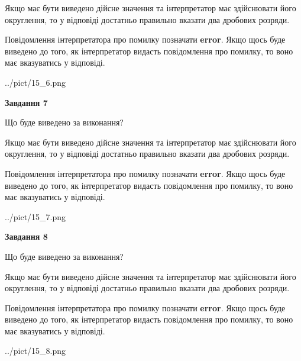 \documentclass[12pt, ukrainian]{article}
\begin{document}
{\begin {Large}
Якщо має бути виведено дійсне значення та інтерпретатор має здійснювати його округлення, 
то у відповіді достатньо правильно вказати два дробових розряди.

Повідомлення інтерпретатора про помилку позначати \textbf{error}.
Якщо щось буде виведено до того, як інтерпретатор видасть повідомлення про помилку, 
то воно має вказуватись у відповіді. \par

\begin{center}
	{../pict/15_6.png}
\end{center}
\newpage

{\begin {center}\textbf{Завдання 7}\end {center}}\par
Що буде виведено за виконання? \par

Якщо має бути виведено дійсне значення та інтерпретатор має здійснювати його округлення, 
то у відповіді достатньо правильно вказати два дробових розряди.

Повідомлення інтерпретатора про помилку позначати \textbf{error}.
Якщо щось буде виведено до того, як інтерпретатор видасть повідомлення про помилку, 
то воно має вказуватись у відповіді. \par

\begin{center}
	{../pict/15_7.png}
\end{center}
\newpage

{\begin {center}\textbf{Завдання 8}\end {center}}\par
Що буде виведено за виконання? \par

Якщо має бути виведено дійсне значення та інтерпретатор має здійснювати його округлення, 
то у відповіді достатньо правильно вказати два дробових розряди.

Повідомлення інтерпретатора про помилку позначати \textbf{error}.
Якщо щось буде виведено до того, як інтерпретатор видасть повідомлення про помилку, 
то воно має вказуватись у відповіді. \par

\begin{center}
	{../pict/15_8.png}
\end{center}
\newpage


\end{Large}}
\end{document}
